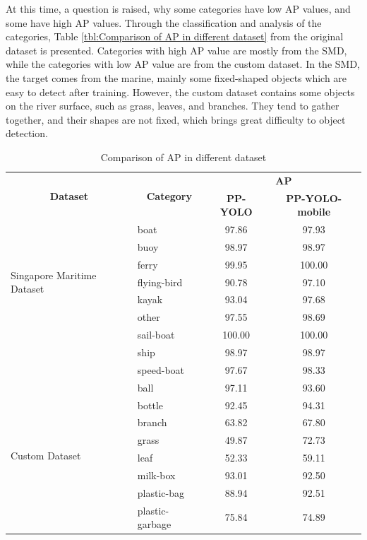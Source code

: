 \documentclass[sensors,article,submit,moreauthors,pdftex]{Definitions/mdpi}
\begin{document}
\begin{paracol}{2}
At this time, a question is raised, why some categories have low AP values, and some have high AP values. Through the classification and analysis of the categories, Table \ref{tbl:Comparison of AP in different dataset} from the original dataset is presented. Categories with high AP value are mostly from the SMD, while the categories with low AP value are from the custom dataset. In the SMD, the target comes from the marine, mainly some fixed-shaped objects which are easy to detect after training. However, the custom dataset contains some objects on the river surface, such as grass, leaves, and branches. They tend to gather together, and their shapes are not fixed, which brings great difficulty to object detection.

\begin{table}[htbp]
\centering
\caption{Comparison of AP in different dataset}
\begin{tabular}{llcc} 
\toprule

\multicolumn{1}{c}{\multirow{2}{*}{\textbf{Dataset}}} &
\multicolumn{1}{c}{\multirow{2}{*}{\textbf{Category}}} &\multicolumn{2}{c}{\textbf{AP}} \\
\cmidrule(l){3-4} 
&& \textbf{PP-YOLO} & \textbf{PP-YOLO-mobile} \\

\midrule
\multirow{7}{*}{Singapore Maritime Dataset} 
& boat& 97.86  & 97.93  \\
& buoy & 98.97 & 98.97 \\
& ferry & 99.95 & 100.00 \\
& flying-bird & 90.78 & 97.10 \\
& kayak & 93.04 & 97.68 \\
& other & 97.55 & 98.69 \\
& sail-boat & 100.00 & 100.00 \\
& ship & 98.97 & 98.97 \\
& speed-boat & 97.67 & 98.33 \\
\cmidrule(r){1-4}

\multirow{8}{*}{Custom Dataset} 
& ball& 97.11  & 93.60 \\
& bottle & 92.45 & 94.31  \\
& branch & 63.82 & 67.80 \\
& grass & 49.87 & 72.73  \\
& leaf & 52.33 & 59.11 \\
& milk-box  & 93.01 & 92.50 \\
& plastic-bag & 88.94 & 92.51 \\
& plastic-garbage & 75.84 & 74.89 \\


\end{tabular}
\end{table}
\end{paracol}
\end{document}
